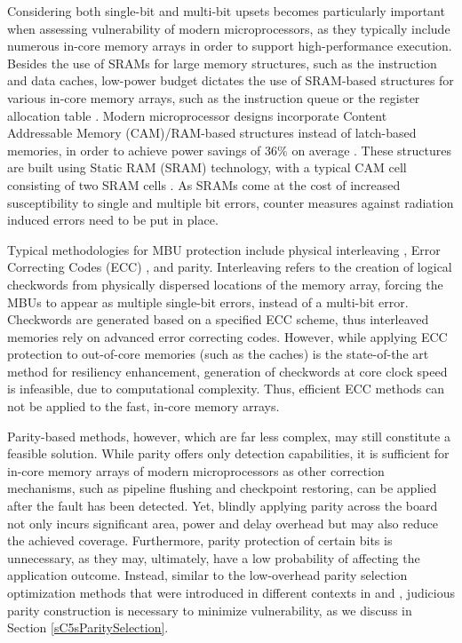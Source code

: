 \documentclass[12pt]{yalephd}
\begin{document}
Considering both single-bit and multi-bit upsets becomes particularly important when assessing vulnerability of modern microprocessors, as they typically include numerous in-core memory arrays in order to support high-performance execution. Besides the use of SRAMs for large memory structures, such as the instruction and data caches, low-power budget dictates the use of SRAM-based structures for various in-core memory arrays, such as the instruction queue or the register allocation table \cite{abella2003power}. Modern microprocessor designs incorporate Content Addressable Memory (CAM)/RAM-based structures \cite{chaudhry2009rock, pagiamtzis2006content} instead of latch-based memories, in order to achieve power savings of 36\% on average \cite{buyuktosunoglu2002tradeoffs}. These structures are built using Static RAM (SRAM) technology, with a typical CAM cell consisting of two SRAM cells \cite{pagiamtzis2006content}. As SRAMs come at the cost of increased susceptibility to single and multiple bit errors, counter measures against radiation induced errors need to be put in place.

Typical methodologies for MBU protection include physical interleaving \cite{slayman2005cache}, Error Correcting Codes (ECC) \cite{naseer2008parallel}, and parity. Interleaving refers to the creation of logical checkwords from physically dispersed locations of the memory array, forcing the MBUs to appear as multiple single-bit errors, instead of a multi-bit error. Checkwords are generated based on a specified ECC scheme, thus interleaved memories rely on advanced error correcting codes. However, while applying ECC protection to out-of-core memories (such as the caches) is the state-of-the art method for resiliency enhancement, generation of checkwords at core clock speed is infeasible, due to computational complexity. Thus, efficient ECC methods can not be applied to the fast, in-core memory arrays.

Parity-based methods, however, which are far less complex, may still constitute a feasible solution. While parity offers only detection capabilities, it is sufficient for in-core memory arrays of modern microprocessors as other correction mechanisms, such as pipeline flushing and checkpoint restoring, can be applied after the fault has been detected. Yet, blindly applying parity across the board not only incurs significant area, power and delay overhead but may also reduce the achieved coverage. Furthermore, parity protection of certain bits is unnecessary, as they may, ultimately, have a low probability of affecting the application outcome. Instead, similar to the low-overhead parity selection optimization methods that were introduced in different contexts in \cite{ADM06} and \cite{touba1997logic}, judicious parity construction is necessary to minimize vulnerability, as we discuss in Section \ref{sC5sParitySelection}.
\end{document}
